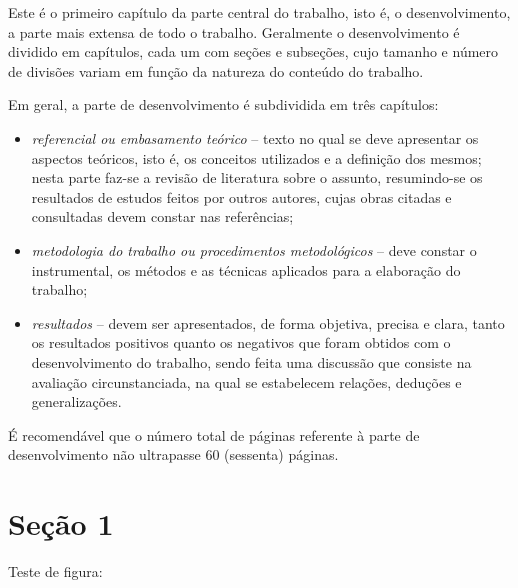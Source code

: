 \documentclass[
	12pt,				%
	openright,			%
	oneside,
	a4paper,				%
	english,				%
	brazil				%
]{abntex2/abntex2} %
\begin{document}
	Este é o primeiro capítulo da parte central do trabalho, isto é, o
desenvolvimento, a parte mais extensa de todo o trabalho. Geralmente o
desenvolvimento é dividido em capítulos, cada um com seções e subseções,
cujo tamanho e número de divisões variam em função da natureza do
conteúdo do trabalho. \cite{ibge1993}

	Em geral, a parte de desenvolvimento é subdividida em três capítulos:

	\begin{itemize}
		\item \textit{referencial ou embasamento teórico} – texto no qual se deve apresentar os aspectos teóricos, isto é, os conceitos utilizados e a definição dos mesmos; nesta parte faz-se a revisão de literatura sobre o assunto, resumindo-se os resultados de estudos feitos por outros autores, cujas obras citadas e consultadas devem constar nas referências;

		\item \textit{metodologia do trabalho ou procedimentos metodológicos} – deve constar o instrumental, os métodos e as técnicas aplicados para a elaboração do trabalho;

		\item \textit{resultados} – devem ser apresentados, de forma objetiva, precisa e clara, tanto os resultados positivos quanto os negativos que foram obtidos com o desenvolvimento do trabalho, sendo feita uma discussão que consiste na avaliação circunstanciada, na qual se estabelecem relações, deduções e generalizações.
	\end{itemize}

	É recomendável que o número total de páginas referente à parte de desenvolvimento não ultrapasse 60 (sessenta) páginas.

	\section{Seção 1}

		Teste de figura:
\end{document}
